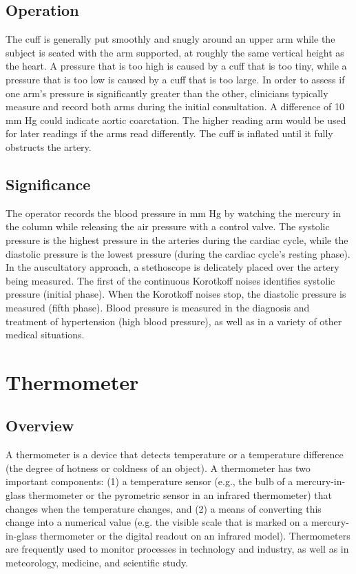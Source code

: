 \documentclass[12pt]{article}
\begin{document}
\subsection{Operation}
The cuff is generally put smoothly and snugly around an upper arm while the subject is seated with the arm supported, at roughly the same vertical height as the heart. A pressure that is too high is caused by a cuff that is too tiny, while a pressure that is too low is caused by a cuff that is too large. In order to assess if one arm's pressure is significantly greater than the other, clinicians typically measure and record both arms during the initial consultation. A difference of 10 mm Hg could indicate aortic coarctation. The higher reading arm would be used for later readings if the arms read differently. The cuff is inflated until it fully obstructs the artery.
\\
\subsection{Significance}
The operator records the blood pressure in mm Hg by watching the mercury in the column while releasing the air pressure with a control valve. The systolic pressure is the highest pressure in the arteries during the cardiac cycle, while the diastolic pressure is the lowest pressure (during the cardiac cycle's resting phase). In the auscultatory approach, a stethoscope is delicately placed over the artery being measured. The first of the continuous Korotkoff noises identifies systolic pressure (initial phase). When the Korotkoff noises stop, the diastolic pressure is measured (fifth phase). Blood pressure is measured in the diagnosis and treatment of hypertension (high blood pressure), as well as in a variety of other medical situations.
\\
\clearpage
\section{Thermometer}
\subsection{Overview}
A thermometer is a device that detects temperature or a temperature difference (the degree of hotness or coldness of an object). A thermometer has two important components: (1) a temperature sensor (e.g., the bulb of a mercury-in-glass thermometer or the pyrometric sensor in an infrared thermometer) that changes when the temperature changes, and (2) a means of converting this change into a numerical value (e.g. the visible scale that is marked on a mercury-in-glass thermometer or the digital readout on an infrared model). Thermometers are frequently used to monitor processes in technology and industry, as well as in meteorology, medicine, and scientific study.
\\
\end{document}
